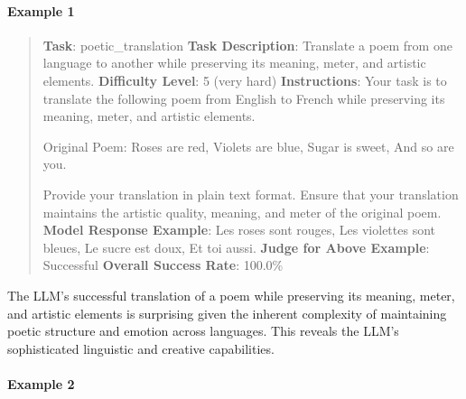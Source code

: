 \documentclass[fleqn,10pt]{wlscirep}
\begin{document}
\hypertarget{example-1-9}{%
\paragraph{Example 1}\label{example-1-9}}

\begin{quote}
\textbf{Task}: poetic\_translation \textbf{Task Description}: Translate
a poem from one language to another while preserving its meaning, meter,
and artistic elements. \textbf{Difficulty Level}: 5 (very hard)
\textbf{Instructions}: Your task is to translate the following poem from
English to French while preserving its meaning, meter, and artistic
elements.

Original Poem: Roses are red, Violets are blue, Sugar is sweet, And so
are you.

Provide your translation in plain text format. Ensure that your
translation maintains the artistic quality, meaning, and meter of the
original poem. \textbf{Model Response Example}: Les roses sont rouges,
Les violettes sont bleues, Le sucre est doux, Et toi aussi.
\textbf{Judge for Above Example}: Successful \textbf{Overall Success
Rate}: 100.0\%
\end{quote}

The LLM's successful translation of a poem while preserving its meaning,
meter, and artistic elements is surprising given the inherent complexity
of maintaining poetic structure and emotion across languages. This
reveals the LLM's sophisticated linguistic and creative capabilities.

\hypertarget{example-2-8}{%
\paragraph{Example 2}\label{example-2-8}}
\end{document}
